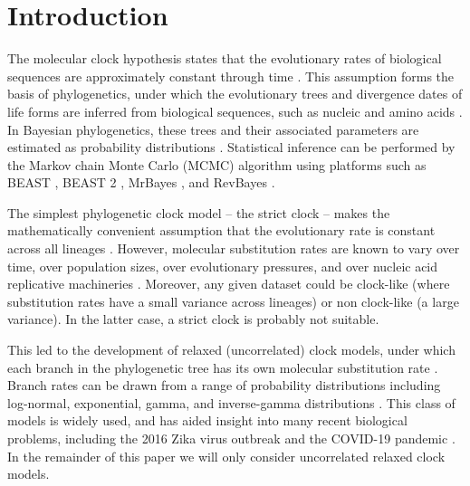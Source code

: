 \documentclass[10pt,letterpaper]{article}
\begin{document}
\linenumbers

\clearpage
\section*{Introduction}


The molecular clock hypothesis states that the evolutionary rates of biological sequences are approximately constant through time \cite{zuckerkandl1962molecular}.
This assumption forms the basis of phylogenetics, under which the evolutionary trees and divergence dates of life forms are inferred from biological sequences, such as nucleic and amino acids \cite{douzery2003local, drummond2006relaxed}.
In Bayesian phylogenetics, these trees and their associated parameters are estimated as probability distributions \cite{kuhner1995estimating, larget1999markov, mau1999bayesian}. 
Statistical inference can be performed by the Markov chain Monte Carlo (MCMC) algorithm \cite{metropolis53, hastings70} using platforms such as BEAST \cite{drummond2012bayesian}, BEAST 2 \cite{bouckaert2019beast}, MrBayes \cite{ronquist2012mrbayes}, and RevBayes \cite{hohna2016revbayes}.



The simplest phylogenetic clock model -- the strict clock -- makes the mathematically convenient assumption that the evolutionary rate is constant across all lineages \cite{zuckerkandl1965evolutionary, kuhner1995estimating, larget1999markov}.  %
However, molecular substitution rates are known to vary over time, over population sizes, over evolutionary pressures, and over nucleic acid replicative machineries \cite{gillespie1994causes, woolfit2009effective, loh2010optimization}.
Moreover, any given dataset could be clock-like (where substitution rates have a small variance across lineages) or non clock-like (a large variance). 
In the latter case, a strict clock is probably not suitable. 



This led to the development of relaxed (uncorrelated) clock models, under which each branch in the phylogenetic tree has its own molecular substitution rate  \cite{drummond2006relaxed}.
Branch rates can be drawn from a range of probability distributions including log-normal, exponential, gamma, and inverse-gamma distributions \cite{drummond2006relaxed, lepage2007general, li2012model}.
This class of models is widely used, and has aided insight into many recent biological problems, including the 2016 Zika virus outbreak \cite{faria2017establishment} and the COVID-19 pandemic \cite{giovanetti2020first}.
In the remainder of this paper we will only consider uncorrelated relaxed clock models.
\end{document}
